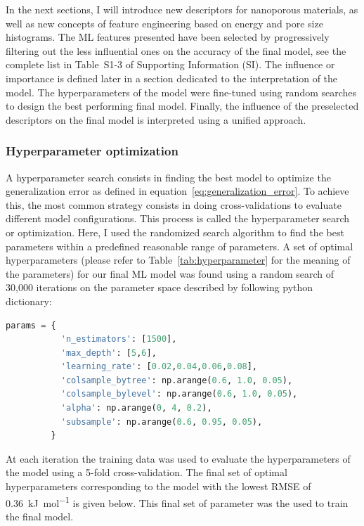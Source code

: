 \documentclass[main]{subfiles}
\begin{document}
In the next sections, I will introduce new descriptors for nanoporous materials, as well as new concepts of feature engineering based on energy and pore size histograms. The ML features presented have been selected by progressively filtering out the less influential ones on the accuracy of the final model, see the complete list in Table~S1-3 of Supporting Information (SI). The influence or importance is defined later in a section dedicated to the interpretation of the model. The hyperparameters of the model were fine-tuned using random searches to design the best performing final model. Finally, the influence of the preselected descriptors on the final model is interpreted using a unified approach.

\subsubsection{Hyperparameter optimization}\label{sct:hyperparameter}

A hyperparameter search consists in finding the best model to optimize the generalization error as defined in equation~\ref{eq:generalization_error}. To achieve this, the most common strategy consists in doing cross-validations to evaluate different model configurations. This process is called the hyperparameter search or optimization. Here, I used the randomized search algorithm to find the best parameters within a predefined reasonable range of parameters. A set of optimal hyperparameters (please refer to Table~\ref{tab:hyperparameter} for the meaning of the parameters) for our final ML model was found using a random search of 30,000 iterations on the parameter space described by following python dictionary:

\begin{lstlisting}[language=Python]
params = {
           'n_estimators': [1500],
           'max_depth': [5,6],
           'learning_rate': [0.02,0.04,0.06,0.08],
           'colsample_bytree': np.arange(0.6, 1.0, 0.05),
           'colsample_bylevel': np.arange(0.6, 1.0, 0.05),
           'alpha': np.arange(0, 4, 0.2),
           'subsample': np.arange(0.6, 0.95, 0.05),
         }
\end{lstlisting}

At each iteration the training data was used to evaluate the hyperparameters of the model using a 5-fold cross-validation. The final set of optimal hyperparameters corresponding to the model with the lowest RMSE of \SI{0.36}{\kilo\joule\per\mole} is given below. This final set of parameter was the used to train the final model.
\end{document}
